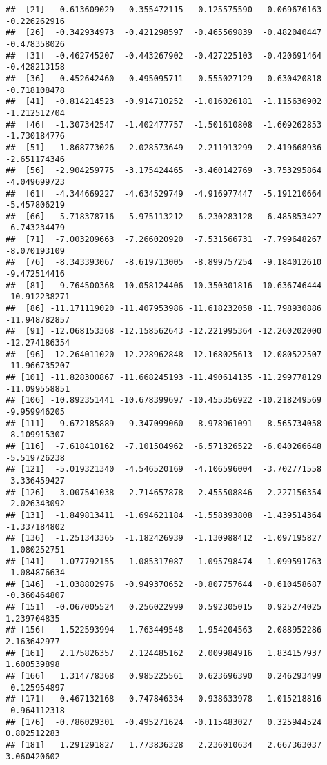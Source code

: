 \documentclass[]{article}
\begin{document}
\begin{verbatim}
##  [21]   0.613609029   0.355472115   0.125575590  -0.069676163  -0.226262916
##  [26]  -0.342934973  -0.421298597  -0.465569839  -0.482040447  -0.478358026
##  [31]  -0.462745207  -0.443267902  -0.427225103  -0.420691464  -0.428213158
##  [36]  -0.452642460  -0.495095711  -0.555027129  -0.630420818  -0.718108478
##  [41]  -0.814214523  -0.914710252  -1.016026181  -1.115636902  -1.212512704
##  [46]  -1.307342547  -1.402477757  -1.501610808  -1.609262853  -1.730184776
##  [51]  -1.868773026  -2.028573649  -2.211913299  -2.419668936  -2.651174346
##  [56]  -2.904259775  -3.175424465  -3.460142769  -3.753295864  -4.049699723
##  [61]  -4.344669227  -4.634529749  -4.916977447  -5.191210664  -5.457806219
##  [66]  -5.718378716  -5.975113212  -6.230283128  -6.485853427  -6.743234479
##  [71]  -7.003209663  -7.266020920  -7.531566731  -7.799648267  -8.070193109
##  [76]  -8.343393067  -8.619713005  -8.899757254  -9.184012610  -9.472514416
##  [81]  -9.764500368 -10.058124406 -10.350301816 -10.636746444 -10.912238271
##  [86] -11.171119020 -11.407953986 -11.618232058 -11.798930886 -11.948782857
##  [91] -12.068153368 -12.158562643 -12.221995364 -12.260202000 -12.274186354
##  [96] -12.264011020 -12.228962848 -12.168025613 -12.080522507 -11.966735207
## [101] -11.828300867 -11.668245193 -11.490614135 -11.299778129 -11.099558851
## [106] -10.892351441 -10.678399697 -10.455356922 -10.218249569  -9.959946205
## [111]  -9.672185889  -9.347099060  -8.978961091  -8.565734058  -8.109915307
## [116]  -7.618410162  -7.101504962  -6.571326522  -6.040266648  -5.519726238
## [121]  -5.019321340  -4.546520169  -4.106596004  -3.702771558  -3.336459427
## [126]  -3.007541038  -2.714657878  -2.455508846  -2.227156354  -2.026343092
## [131]  -1.849813411  -1.694621184  -1.558393808  -1.439514364  -1.337184802
## [136]  -1.251343365  -1.182426939  -1.130988412  -1.097195827  -1.080252751
## [141]  -1.077792155  -1.085317087  -1.095798474  -1.099591763  -1.084876634
## [146]  -1.038802976  -0.949370652  -0.807757644  -0.610458687  -0.360464807
## [151]  -0.067005524   0.256022999   0.592305015   0.925274025   1.239704835
## [156]   1.522593994   1.763449548   1.954204563   2.088952286   2.163642977
## [161]   2.175826357   2.124485162   2.009984916   1.834157937   1.600539898
## [166]   1.314778368   0.985225561   0.623696390   0.246293499  -0.125954897
## [171]  -0.467132168  -0.747846334  -0.938633978  -1.015218816  -0.964112318
## [176]  -0.786029301  -0.495271624  -0.115483027   0.325944524   0.802512283
## [181]   1.291291827   1.773836328   2.236010634   2.667363037   3.060420602

\end{verbatim}
\end{document}

